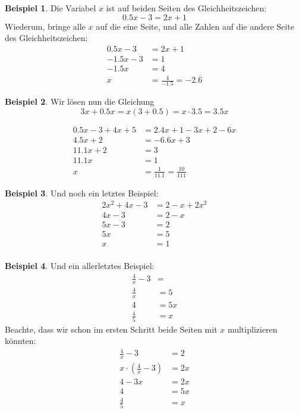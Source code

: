 \documentclass[%
11pt,%
twoside,%
titlepage,%
swissgerman,%
headsepline%
]{scrartcl}
\theoremstyle{definition}
\newtheorem{bsp}{Beispiel}[subsection] %
\theoremstyle{plain}
\begin{document}
	\begin{bsp} Die Variabel $x$ ist auf beiden Seiten des Gleichheitszeichen: $$0.5 x-3 = 2 x+1$$ Wiederum, bringe alle $x$ auf die eine Seite, und alle Zahlen auf die andere Seite des Gleichheitszeichen:
		\begin{align*}
			0.5 x-3 & = 2 x+1\tag{$-2x$}\\
			-1.5 x -3 & = 1 \tag{$+3$}\\
			-1.5 x & =4 \tag{$\div-1.5$}\\
			x & = \frac{4}{-1.5}={-2.\overline{6}}
		\end{align*}
	\end{bsp}
	
	\begin{bsp}
		Wir lösen nun die Gleichung
		$$3x+0.5x=x(3+0.5)=x\cdot 3.5=3.5x$$
		
		\begin{align*}
			0.5 x-3 +4x +5& = 2.4 x+1 -3x+2-6x\\
			4.5 x +2 & = -6.6x +3\tag{$+6.6x$}\\
			11.1 x +2 & = 3\tag{$-2$}\\
			11.1 x & =1\tag{$\div11.1$}\\
			x & = \frac{1}{11.1}=\frac{10}{111}
		\end{align*}
	\end{bsp}           
	
	\begin{bsp}
		Und noch ein letztes Beispiel:
		\begin{align*}
			2x^2+4x-3 &=  2-x+2x^2 \tag{$-2x^2$}\\
			4x -3 & = 2-x\tag{$+x$}\\
			5x -3 & = 2\tag{$+3$}\\
			5x & = 5\tag{$\div5$}\\
			x &= {1}\\
		\end{align*}
	\end{bsp}           
	
	\begin{bsp}
		Und ein allerletztes Beispiel: 
		\begin{align*}
			\frac{4}{x}-3 &= \tag{$+3$}\\
			\frac{4}{x} & = 5\tag{$\cdot x$}\\
			4 & =  5x\tag{$\div5$}\\
			{\frac{4}{5}}& = x  
		\end{align*}
		Beachte, dass wir schon im ersten Schritt beide Seiten mit $x$ multiplizieren könnten:
		\begin{align*}
			\frac{4}{x}-3 &= 2\tag{$\cdot x$}\\
			x\cdot (\frac{4}{x}-3) & = 2x \\
			4-3x & = 2x\tag{$+3x$}\\
			4 & =  5x\tag{$\div5$}\\
			{\frac{4}{5}}& = x  
		\end{align*}
	\end{bsp}
	
\end{document}
